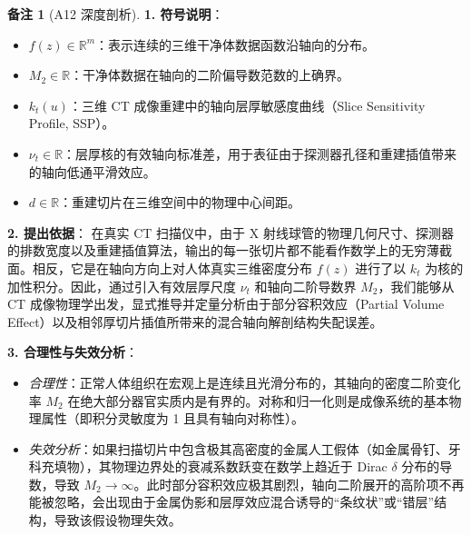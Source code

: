 \documentclass[11pt,a4paper,UTF8,fontset=fandol]{ctexart}
\theoremstyle{definition}
\newtheorem{remark}[theorem]{备注}
\begin{document}
\begin{remark}[A12 深度剖析]
\textbf{1. 符号说明}：
\begin{itemize}[leftmargin=2em]
    \item $f(z) \in \mathbb{R}^m$：表示连续的三维干净体数据函数沿轴向的分布。
    \item $M_2 \in \mathbb{R}$：干净体数据在轴向的二阶偏导数范数的上确界。
    \item $k_t(u)$：三维 CT 成像重建中的轴向层厚敏感度曲线（Slice Sensitivity Profile, SSP）。
    \item $\nu_t \in \mathbb{R}$：层厚核的有效轴向标准差，用于表征由于探测器孔径和重建插值带来的轴向低通平滑效应。
    \item $d \in \mathbb{R}$：重建切片在三维空间中的物理中心间距。
\end{itemize}

\textbf{2. 提出依据}：
在真实 CT 扫描仪中，由于 X 射线球管的物理几何尺寸、探测器的排数宽度以及重建插值算法，输出的每一张切片都不能看作数学上的无穷薄截面。相反，它是在轴向方向上对人体真实三维密度分布 $f(z)$ 进行了以 $k_t$ 为核的加性积分。因此，通过引入有效层厚尺度 $\nu_t$ 和轴向二阶导数界 $M_2$，我们能够从 CT 成像物理学出发，显式推导并定量分析由于部分容积效应（Partial Volume Effect）以及相邻厚切片插值所带来的混合轴向解剖结构失配误差。

\textbf{3. 合理性与失效分析}：
\begin{itemize}[leftmargin=2em]
    \item \emph{合理性}：正常人体组织在宏观上是连续且光滑分布的，其轴向的密度二阶变化率 $M_2$ 在绝大部分器官实质内是有界的。对称和归一化则是成像系统的基本物理属性（即积分灵敏度为 1 且具有轴向对称性）。
    \item \emph{失效分析}：如果扫描切片中包含极其高密度的金属人工假体（如金属骨钉、牙科充填物），其物理边界处的衰减系数跃变在数学上趋近于 Dirac $\delta$ 分布的导数，导致 $M_2 \to \infty$。此时部分容积效应极其剧烈，轴向二阶展开的高阶项不再能被忽略，会出现由于金属伪影和层厚效应混合诱导的“条纹状”或“错层”结构，导致该假设物理失效。
\end{itemize}
\end{remark}
\end{document}
